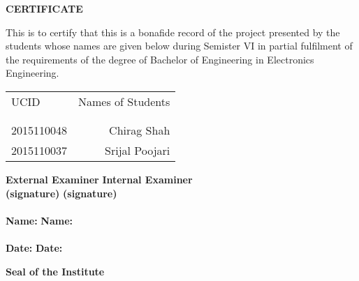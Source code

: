 \newpage
\thispagestyle{empty}
\vspace*{0.2cm}
\vspace{1cm}
\begin{center}
 \large\textbf{CERTIFICATE }
\end{center}%
\vspace{2cm}
This is to certify that this is a bonafide record of the project presented by the students whose names are given below during Semister VI in partial fulfilment of the requirements of the degree of Bachelor of Engineering in Electronics Engineering.

\begin{table}[h]
\centering
\begin{tabular}{lr}
UCID & Names of Students \\ \\ \hline
\\
2015110048 &  Chirag Shah \\
2015110037 &  Srijal Poojari \\ 
 \hline 
\end{tabular}
\end{table}

\vspace{2.5cm}
\textbf {External Examiner} \hspace{2.8in} \textbf{Internal Examiner}
\vspace{2cm}\\
\textbf {(signature)} \hspace{3.5in} \textbf{(signature)} \\
\vspace{1cm}\\
\textbf {Name:} \hspace{3in} \textbf{Name:}\\ 
\vspace{1cm}\\
\textbf {Date:} \hspace{3in} \textbf{Date:}\\ 
\vspace{2cm}

\begin{center}
\textbf{Seal of the Institute}\\
\end{center}
\vspace{2cm}

